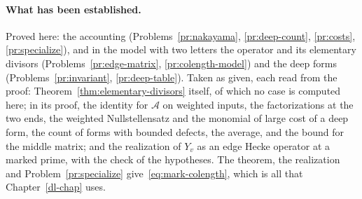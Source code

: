 \documentclass[reqno]{amsart}
\newcounter{chap}
\numberwithin{equation}{section}
\theoremstyle{plain}
\theoremstyle{definition}
\theoremstyle{remark}
\newcommand{\Ac}{\mathcal A}
\begin{document}
\paragraph{What has been established.}  Proved here: the accounting (Problems~\ref{pr:nakayama}, \ref{pr:deep-count}, \ref{pr:costs}, \ref{pr:specialize}), and in the model with two letters the operator and its elementary divisors (Problems~\ref{pr:edge-matrix}, \ref{pr:colength-model}) and the deep forms (Problems~\ref{pr:invariant}, \ref{pr:deep-table}).  Taken as given, each read from the proof: Theorem~\ref{thm:elementary-divisors} itself, of which no case is computed here; in its proof, the identity for \(\Ac\) on weighted inputs, the factorizations at the two ends, the weighted Nullstellensatz and the monomial of large cost of a deep form, the count of forms with bounded defects, the average, and the bound for the middle matrix; and the realization of \(Y_v\) as an edge Hecke operator at a marked prime, with the check of the hypotheses.  The theorem, the realization and Problem~\ref{pr:specialize} give~\eqref{eq:mark-colength}, which is all that Chapter~\ref{dl-chap} uses.
\end{document}
